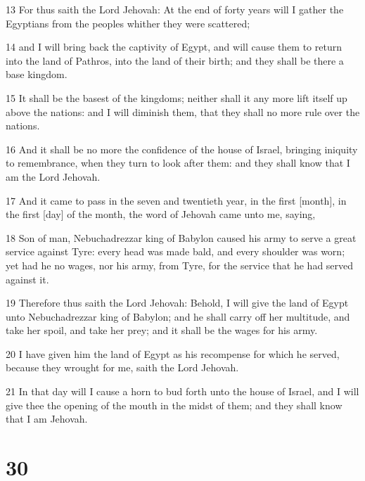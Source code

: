 \par 13 For thus saith the Lord Jehovah: At the end of forty years will I gather the Egyptians from the peoples whither they were scattered;
\par 14 and I will bring back the captivity of Egypt, and will cause them to return into the land of Pathros, into the land of their birth; and they shall be there a base kingdom.
\par 15 It shall be the basest of the kingdoms; neither shall it any more lift itself up above the nations: and I will diminish them, that they shall no more rule over the nations.
\par 16 And it shall be no more the confidence of the house of Israel, bringing iniquity to remembrance, when they turn to look after them: and they shall know that I am the Lord Jehovah.
\par 17 And it came to pass in the seven and twentieth year, in the first [month], in the first [day] of the month, the word of Jehovah came unto me, saying,
\par 18 Son of man, Nebuchadrezzar king of Babylon caused his army to serve a great service against Tyre: every head was made bald, and every shoulder was worn; yet had he no wages, nor his army, from Tyre, for the service that he had served against it.
\par 19 Therefore thus saith the Lord Jehovah: Behold, I will give the land of Egypt unto Nebuchadrezzar king of Babylon; and he shall carry off her multitude, and take her spoil, and take her prey; and it shall be the wages for his army.
\par 20 I have given him the land of Egypt as his recompense for which he served, because they wrought for me, saith the Lord Jehovah.
\par 21 In that day will I cause a horn to bud forth unto the house of Israel, and I will give thee the opening of the mouth in the midst of them; and they shall know that I am Jehovah.

\chapter{30}

